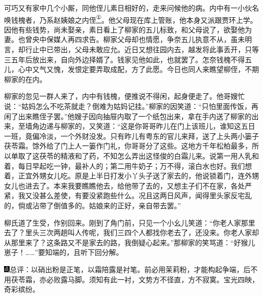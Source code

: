 可巧又有家中几个小厮，同他侄儿素日相好的，走来问候他的病。内中有一小伙名唤钱槐者，乃系赵姨娘之内侄\href{../Text/part0064_split_000.html\#lnkback_1_a}{\textsuperscript{①}}。他父母现在库上管账，他本身又派跟贾环上学。因他有些钱势，尚未娶亲，素日看上了柳家的五儿标致，和父母说了，欲娶他为妻。也曾央中保媒人再四求告。柳家父母却也情愿，争奈五儿执意不从，虽未明言，却行止中已带出，父母未敢应允。近日又想往园内去，越发将此事丢开，只等三五年后放出来，自向外边择婿了。钱家见他如此，也就罢了。怎奈钱槐不得五儿，心中又气又愧，发恨定要弄取成配，方了此愿。今日也同人来瞧望柳侄，不期柳家的在内。

柳家的忽见一群人来了，内中有钱槐，便推说不得闲，起身便走了。他哥嫂忙说：``姑妈怎么不吃茶就走？倒难为姑妈记挂。''柳家的因笑道：``只怕里面传饭，再闲了出来瞧侄子罢。''他嫂子因向抽屉内取了一个纸包出来，拿在手内送了柳家的出来，至墙角边递与柳家的，又笑道：``这是你哥哥昨儿在门上该班儿，谁知这五日一班，竟偏冷淡，一个外财没发。只有昨儿有粤东的官儿来拜，送了上头两小篓子茯苓霜。馀外给了门上人一篓作门礼，你哥哥分了这些。这地方千年松柏最多，所以单取了这茯苓的精液和了药，不知怎么弄出这怪俊的白霜儿来。说第一用人乳和着，每日早起吃一钟，最补人的；第二用牛奶子；万不得，滚白水也好。我们想着，正宜外甥女儿吃。原是上半日打发小丫头子送了家去的，他说锁着门，连外甥女儿也进去了。本来我要瞧瞧他去，给他带了去的，又想主子们不在家，各处严紧，我又没甚么差使，有要没紧跑些什么。况且这两日风声，闻得里头家反宅乱的，倘或沾带了倒值多的。姑娘来的正好，亲自带去罢。''

柳氏道了生受，作别回来。刚到了角门前，只见一个小幺儿笑道：``你老人家那里去了？里头三次两趟叫人传呢，我们三四个人都找你老去了，还没来。你老人家却从那里来了？这条路又不是家去的路，我倒疑心起来。''那柳家的笑骂道：``好猴儿崽子！\ldots{}\ldots{}''要知端的，且听下回分解。

{\includegraphics[width=3mm]{../Images/00005}总评：以硝出粉是正笔，以霜陪露是衬笔。前必用茉莉粉，才能构起争端，后不用茯苓霜，亦必败露马脚。须知有此一衬，文势方不径直，方不寂寞。宝光四映，奇彩缤纷。}


